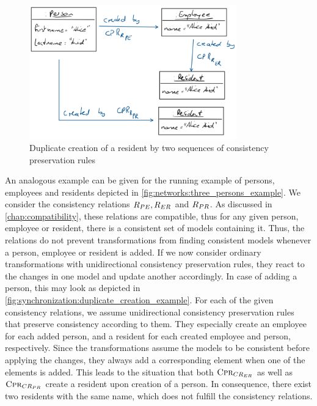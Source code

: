 \begin{figure}
    \centering
    \includegraphics[width=0.8\textwidth]{figures/correctness/synchronization/duplicate_creation_example.png}    
    \caption[Duplicate creation of an element]{Duplicate creation of a resident by two sequences of consistency preservation rules}
    \label{fig:synchronization:duplicate_creation_example}
\end{figure}

An analogous example can be given for the running example of persons, employees and residents depicted in \autoref{fig:networks:three_persons_example}.
We consider the consistency relations $R_{PE}, R_{ER}$ and $R_{PR}$.
As discussed in \autoref{chap:compatibility}, these relations are compatible, thus for any given person, employee or resident, there is a consistent set of models containing it.
Thus, the relations do not prevent transformations from finding consistent models whenever a person, employee or resident is added.
If we now consider ordinary transformations with unidirectional consistency preservation rules, they react to the changes in one model and update another accordingly.
In case of adding a person, this may look as depicted in \autoref{fig:synchronization:duplicate_creation_example}.
For each of the given consistency relations, we assume unidirectional consistency preservation rules that preserve consistency according to them.
They especially create an employee for each added person, and a resident for each created employee and person, respectively.
Since the transformations assume the models to be consistent before applying the changes, they always add a corresponding element when one of the elements is added.
This leads to the situation that both $\textsc{Cpr}_{CR_{ER}}$ as well as $\textsc{Cpr}_{CR_{PR}}$ create a resident upon creation of a person.
In consequence, there exist two residents with the same name, which does not fulfill the consistency relations.

